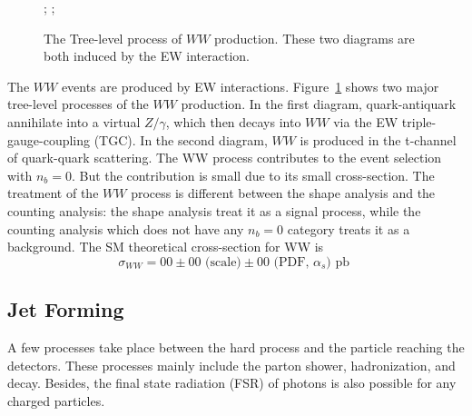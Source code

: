 \begin{figure}[ht]
    \centering
    ; \qquad
    ;
    \caption{The Tree-level process of $WW$ production. These two diagrams are both induced by the EW interaction. }
    \label{fig:relatedWorks:ppCollision:ww}
\end{figure}

\noindent The $WW$ events are produced by EW interactions. Figure~\ref{fig:relatedWorks:ppCollision:ww} shows two major tree-level processes of the $WW$ production. In the first diagram, quark-antiquark annihilate into a virtual $Z/\gamma$, which then decays into $WW$ via the EW triple-gauge-coupling (TGC). In the second diagram, $WW$ is produced in the t-channel of quark-quark scattering. The WW process contributes to the event selection with $n_b=0$. But the contribution is small due to its small cross-section. The treatment of the $WW$ process is different between the shape analysis and the counting analysis: the shape analysis treat it as a signal process, while the counting analysis which does not have any $n_b=0$ category treats it as a background. The SM theoretical cross-section for WW is 
\begin{equation}
    \sigma_{WW} = 00 \pm 00  \text{~(scale)}  \pm 00  \text{~(PDF, $\alpha_s$)~pb }
\end{equation}


\subsection{Jet Forming}
\label{sec:relatedWorks:ppCollision:psJet} 

A few processes take place between the hard process and the particle reaching the detectors. These processes mainly include the parton shower, hadronization, and decay. Besides, the final state radiation (FSR) of photons is also possible for any charged particles.

